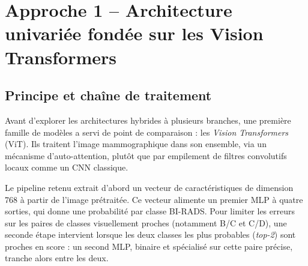 \documentclass[12pt,a4paper]{report}
\begin{document}
\section{Approche 1 -- Architecture univariée fondée sur les Vision Transformers}
\label{sec:approche1}

\subsection{Principe et chaîne de traitement}
Avant d'explorer les architectures hybrides à plusieurs branches, une
première famille de modèles a servi de point de comparaison : les
\emph{Vision Transformers} (ViT). Ils traitent l'image mammographique dans
son ensemble, via un mécanisme d'auto-attention, plutôt que par empilement
de filtres convolutifs locaux comme un CNN classique.

Le pipeline retenu extrait d'abord un vecteur de caractéristiques de
dimension 768 à partir de l'image prétraitée. Ce vecteur alimente un premier
MLP à quatre sorties, qui donne une probabilité par classe BI-RADS. Pour
limiter les erreurs sur les paires de classes visuellement proches
(notamment B/C et C/D), une seconde étape intervient lorsque les deux
classes les plus probables (\emph{top-2}) sont proches en score : un second
MLP, binaire et spécialisé sur cette paire précise, tranche alors entre les
deux.
\end{document}
